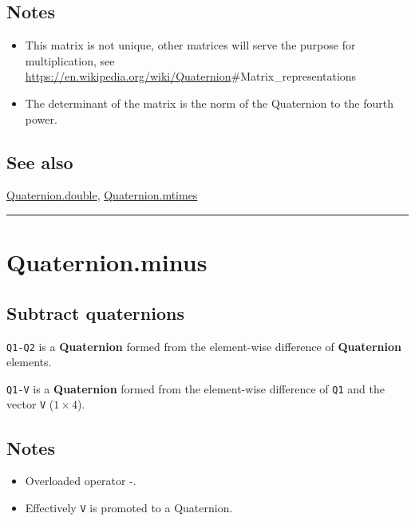 \subsection*{Notes}
\begin{itemize}
  \item This matrix is not unique, other matrices will serve the purpose for    multiplication, see \url{https://en.wikipedia.org/wiki/Quaternion}\#Matrix\_representations
  \item The determinant of the matrix is the norm of the Quaternion to the fourth power.
\end{itemize}

\subsection*{See also}


\hyperlink{Quaternion.double}{\color{blue} Quaternion.double}, \hyperlink{Quaternion.mtimes}{\color{blue} Quaternion.mtimes}

\vspace{1.5ex}\hrule

\hypertarget{Quaternion.minus}{\section*{Quaternion.minus}}
\subsection*{Subtract quaternions}


\texttt{Q1-Q2} is a \textbf{\color{red} Quaternion} formed from the element-wise difference of \textbf{\color{red} Quaternion} elements.



\texttt{Q1-V}  is a \textbf{\color{red} Quaternion} formed from the element-wise difference of \texttt{Q1} and the
vector \texttt{V} ($1 \times 4$).


\subsection*{Notes}
\begin{itemize}
  \item Overloaded operator \textquotesingle -\textquotesingle .
  \item Effectively \texttt{V} is promoted to a Quaternion.
\end{itemize}

